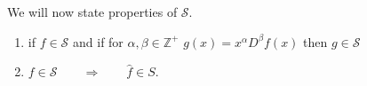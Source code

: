 
We will now state properties of $\mathcal{S}$.
\begin{lemma}
	\begin{enumerate}
		\item if $f \in \mathcal{S}$ and if for $\alpha, \beta \in \mathbb{Z}^+$ $g(x) = x^{\alpha} D^{\beta}f(x)$ then $g \in \mathcal{S}$
		\item $f \in  \mathcal{S} \qquad \Rightarrow \qquad \hat{f} \in S$.
	\end{enumerate}
\end{lemma}

\cleardoubleoddemptypage
{}
\setcounter{page}{1}

